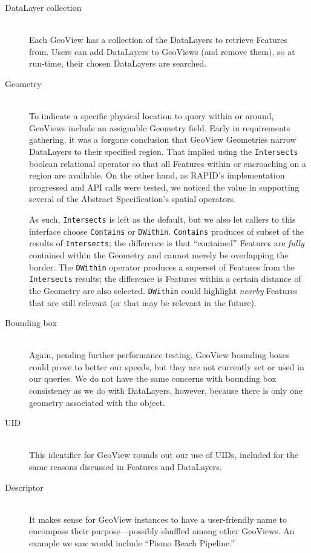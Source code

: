 \begin{description}

\item[DataLayer collection] \hfill \\
Each GeoView has a collection of the DataLayers to retrieve Features from. Users can add DataLayers to GeoViews (and remove them), so at run-time, their chosen DataLayers are searched.

\item[Geometry] \hfill \\
To indicate a specific physical location to query within or around, GeoViews include an assignable Geometry field. Early in requirements gathering, it was a forgone conclusion that GeoView Geometries narrow DataLayers to their specified region. That implied using the \texttt{Intersects} boolean relational operator so that all Features within or encroaching on a region are available. On the other hand, as RAPID's implementation progressed and API calls were tested, we noticed the value in supporting several of the Abstract Specification's spatial operators.

As such, \texttt{Intersects} is left as the default, but we also let callers to this interface choose \texttt{Contains} or \texttt{DWithin}. \texttt{Contains} produces of subset of the results of \texttt{Intersects}; the difference is that ``contained'' Features are \textit{fully} contained within the Geometry and cannot merely be overlapping the border. The \texttt{DWithin} operator produces a superset of Features from the \texttt{Intersects} results; the difference is Features within a certain distance of the Geometry are also selected. \texttt{DWithin} could highlight \textit{nearby} Features that are still relevant (or that may be relevant in the future).

\item[Bounding box] \hfill \\
Again, pending further performance testing, GeoView bounding boxes could prove to better our speeds, but they are not currently set or used in our queries. We do not have the same concerns with bounding box consistency as we do with DataLayers, however, because there is only one geometry associated with the object.

\item[UID] \hfill \\
This identifier for GeoView rounds out our use of UIDs, included for the same reasons discussed in Features and DataLayers.

\item[Descriptor] \hfill \\
It makes sense for GeoView instances to have a user-friendly name to encompass their purpose---possibly shuffled among other GeoViews. An example we saw would include ``Pismo Beach Pipeline.''


\end{description}
